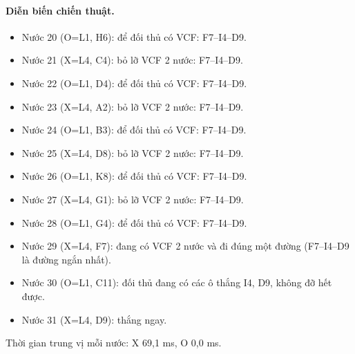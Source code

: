 \paragraph{Diễn biến chiến thuật.}
\begin{itemize}\small
\setlength{\itemsep}{0pt}
  \item Nước 20 (O=L1, H6): để đối thủ có VCF: F7--I4--D9.
  \item Nước 21 (X=L4, C4): bỏ lỡ VCF 2 nước: F7--I4--D9.
  \item Nước 22 (O=L1, D4): để đối thủ có VCF: F7--I4--D9.
  \item Nước 23 (X=L4, A2): bỏ lỡ VCF 2 nước: F7--I4--D9.
  \item Nước 24 (O=L1, B3): để đối thủ có VCF: F7--I4--D9.
  \item Nước 25 (X=L4, D8): bỏ lỡ VCF 2 nước: F7--I4--D9.
  \item Nước 26 (O=L1, K8): để đối thủ có VCF: F7--I4--D9.
  \item Nước 27 (X=L4, G1): bỏ lỡ VCF 2 nước: F7--I4--D9.
  \item Nước 28 (O=L1, G4): để đối thủ có VCF: F7--I4--D9.
  \item Nước 29 (X=L4, F7): đang có VCF 2 nước và đi đúng một đường (F7--I4--D9 là đường ngắn nhất).
  \item Nước 30 (O=L1, C11): đối thủ đang có các ô thắng I4, D9, không đỡ hết được.
  \item Nước 31 (X=L4, D9): thắng ngay.
\end{itemize}
Thời gian trung vị mỗi nước: X 69,1 ms, O 0,0 ms.
\clearpage

